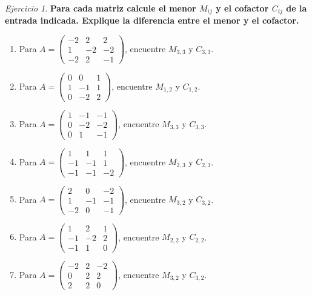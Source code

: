 \documentclass[12pt]{article}
\theoremstyle{remark}
\newtheorem{Ejer}[definicion]{Ejercicio}
\begin{document}
\begin{Ejer}

\textbf{Para cada matriz calcule el menor $M_{ij}$ y el cofactor $C_{ij}$ de la entrada indicada. Explique la diferencia entre el menor y el cofactor.}
\begin{enumerate}[resume=banco]

\item Para $A=\begin{pmatrix}-2&2&2\\1&-2&-2\\-2&2&-1\end{pmatrix}$, encuentre $M_{3,3}$ y $C_{3,3}$.

\item Para $A=\begin{pmatrix}0&0&1\\1&-1&1\\0&-2&2\end{pmatrix}$, encuentre $M_{1,2}$ y $C_{1,2}$.

\item Para $A=\begin{pmatrix}1&-1&-1\\0&-2&-2\\0&1&-1\end{pmatrix}$, encuentre $M_{3,3}$ y $C_{3,3}$.

\item Para $A=\begin{pmatrix}1&1&1\\-1&-1&1\\-1&-1&-2\end{pmatrix}$, encuentre $M_{2,3}$ y $C_{2,3}$.

\item Para $A=\begin{pmatrix}2&0&-2\\1&-1&-1\\-2&0&-1\end{pmatrix}$, encuentre $M_{3,2}$ y $C_{3,2}$.

\item Para $A=\begin{pmatrix}1&2&1\\-1&-2&2\\-1&1&0\end{pmatrix}$, encuentre $M_{2,2}$ y $C_{2,2}$.

\item Para $A=\begin{pmatrix}-2&2&-2\\0&2&2\\2&2&0\end{pmatrix}$, encuentre $M_{3,2}$ y $C_{3,2}$.


\end{enumerate}
\end{Ejer}
\end{document}
